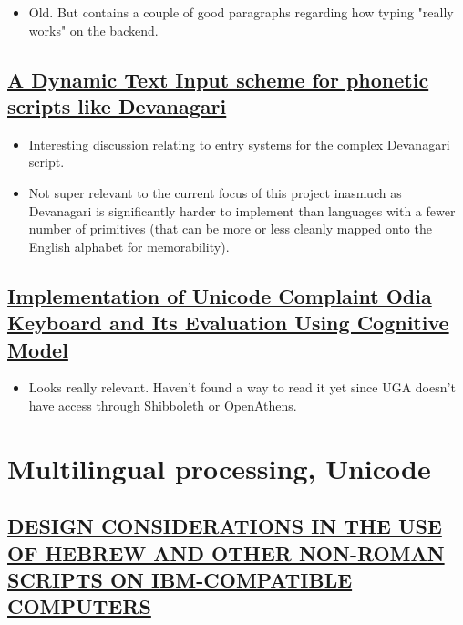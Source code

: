 \documentclass[11pt]{article}
\begin{document}
\begin{itemize}
\item Old. But contains a couple of good paragraphs regarding how typing "really works" on the backend.
\end{itemize}

\subsection{\href{https://www.academia.edu/6098604/A\_Dynamic\_Text\_Input\_scheme\_for\_phonetic\_scripts\_like\_Devanagari}{A Dynamic Text Input scheme for phonetic scripts like Devanagari}}
\label{sec:org24b9007}

\begin{itemize}
\item Interesting discussion relating to entry systems for the complex Devanagari script.
\item Not super relevant to the current focus of this project inasmuch as Devanagari is significantly harder to implement than languages with a fewer number of primitives (that can be more or less cleanly mapped onto the English alphabet for memorability).
\end{itemize}

\subsection{\href{https://ieeexplore.ieee.org/document/7033301/}{Implementation of Unicode Complaint Odia Keyboard and Its Evaluation Using Cognitive Model}}
\label{sec:org9fe7816}

\begin{itemize}
\item Looks really relevant. Haven't found a way to read it yet since UGA doesn't have access through Shibboleth or OpenAthens.
\end{itemize}

\section{Multilingual processing, Unicode}
\label{sec:org992990e}

\subsection{\href{https://www.jstor.org/stable/23535305}{DESIGN CONSIDERATIONS IN THE USE OF HEBREW AND OTHER NON-ROMAN SCRIPTS ON IBM-COMPATIBLE COMPUTERS}}
\label{sec:orgf3aec20}
\end{document}
